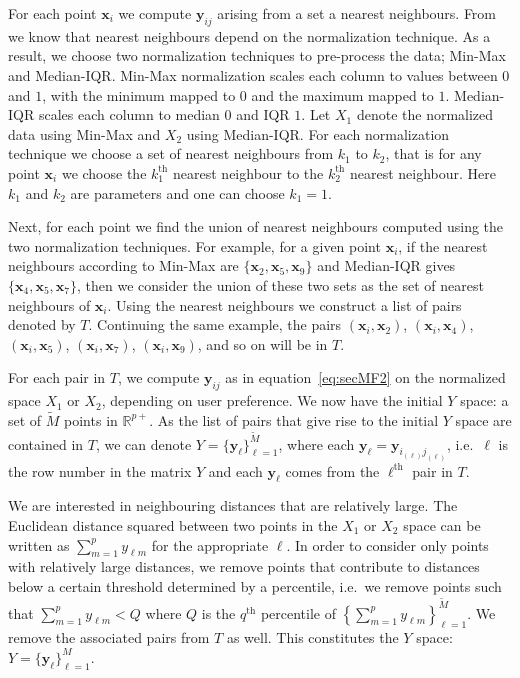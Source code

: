 \documentclass[letter,12pt]{article}
\begin{document}
For each point $\bm{x}_i$ we compute $\bm{y}_{ij}$ arising from a set a nearest neighbours. From \cite{kandanaarachchi2018normalization} we know that nearest neighbours depend on the normalization technique. As a result, we choose two normalization techniques to pre-process the data; Min-Max and Median-IQR. Min-Max normalization scales each column to values between $0$ and $1$, with the minimum mapped to $0$ and the maximum mapped to $1$. Median-IQR scales each column to median $0$ and IQR $1$. Let $X_1$ denote the normalized data using Min-Max and $X_2$ using Median-IQR. For each normalization technique we choose a set of nearest neighbours from $k_1$ to $k_2$, that is for any point $\bm{x}_i$ we choose the $k_1^{\text{th}}$ nearest neighbour to the $k_2^{\text{th}}$ nearest neighbour. Here $k_1$ and $k_2$ are parameters and one can choose $k_1 =1$.

Next, for each point we find the union of nearest neighbours computed using the two normalization techniques. For example, for a given point $\bm{x}_i$, if the nearest neighbours according to Min-Max are $\{\bm{x}_2, \bm{x}_5, \bm{x}_9 \}$ and Median-IQR gives $\{\bm{x}_4, \bm{x}_5, \bm{x}_7 \}$, then we consider the union of these two sets as the set of nearest neighbours of $\bm{x}_i$. Using the nearest neighbours we construct a list of pairs denoted by $T$. Continuing the same example, the pairs $(\bm{x}_i, \bm{x}_2)$, $(\bm{x}_i, \bm{x}_4)$, $(\bm{x}_i, \bm{x}_5)$, $(\bm{x}_i, \bm{x}_7)$, $(\bm{x}_i, \bm{x}_9)$, and so on will be in $T$.

For each pair in $T$, we compute $\bm{y}_{ij}$ as in equation~\eqref{eq:secMF2} on the normalized space $X_1$ or $X_2$, depending on user preference. We now have the initial $Y$ space: a set of $\tilde{M}$ points in $\mathbb{R}^{p+}$. As the list of pairs that give rise to the initial $Y$ space are contained in $T$, we can denote $Y = \{ \bm{y}_\ell \}_{\ell=1}^{\tilde{M}}$, where each $\bm{y}_\ell = \bm{y}_{i_{(\ell)} j_{(\ell)} }$, i.e.\ $\ell$ is the row number in the matrix $Y$ and each $\bm{y}_\ell$ comes from the $\ell^{\text{th}}$ pair in $T$.

We are interested in neighbouring distances that are relatively large. The Euclidean distance squared between two points in the $X_1$ or $X_2$ space can be written as $\sum_{m=1}^p y_{\ell m}$ for the appropriate $\ell$. In order to consider only points with relatively large distances, we remove points that contribute to distances below a certain threshold determined by a percentile, i.e.\ we remove points such that $\sum_{m=1}^p y_{\ell m} < Q$ where $Q$ is the $q^{\text{th}}$ percentile of $ \left \{\sum_{m=1}^p y_{\ell m} \right \}_{\ell=1}^{\tilde{M}}$. We remove the associated pairs from $T$ as well. This constitutes the $Y$ space: $Y = \{\bm{y}_\ell \}_{\ell=1}^M$.
\end{document}
